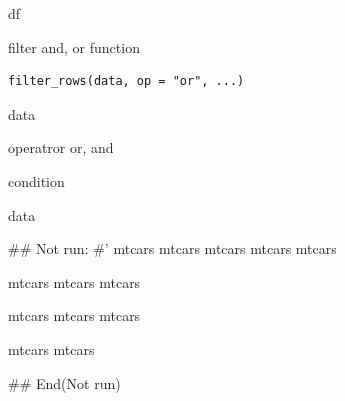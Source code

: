 \documentclass[a4paper]{book}
\begin{document}
%
\begin{Value}
df
\end{Value}
%
\begin{Examples}
\end{Examples}
%
\begin{Description}
filter and,  or function
\end{Description}
%
\begin{Usage}
\begin{verbatim}
filter_rows(data, op = "or", ...)
\end{verbatim}
\end{Usage}
%
\begin{Arguments}
\begin{ldescription}
\item[\code{data}] data

\item[\code{op}] operatror or, and

\item[\code{...}] condition
\end{ldescription}
\end{Arguments}
%
\begin{Value}
data
\end{Value}
%
\begin{Examples}
\begin{ExampleCode}

## Not run: 
#'
mtcars %
mtcars %
mtcars %
mtcars %
mtcars %

mtcars %
mtcars %
mtcars %

mtcars %
mtcars %
mtcars %

mtcars %
mtcars %

## End(Not run)

\end{ExampleCode}
\end{Examples}
\end{document}
